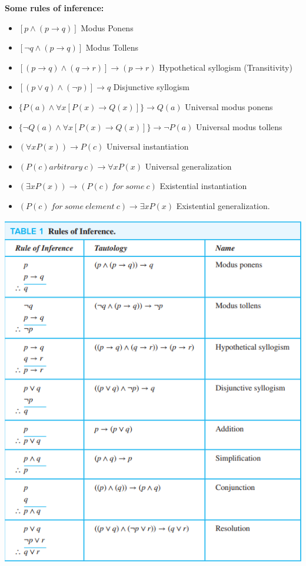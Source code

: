 \documentclass[12pt]{article}
\begin{document}
\medskip
\textbf{Some rules of inference:} 
\begin{itemize}
\item $[ p \wedge (p \rightarrow q) ]$ Modus Ponens
\item $[ \neg q \wedge (p \rightarrow q)]$ Modus Tollens
\item $[(p \rightarrow q) \wedge (q \rightarrow r)] \rightarrow (p \rightarrow r)$ Hypothetical syllogism (Transitivity)
\item $[(p \vee q) \wedge (\neg p)] \rightarrow q$ Disjunctive syllogism
\item $\{P(a) \wedge \forall x [P(x) \rightarrow Q(x)]\} \rightarrow Q(a)$ Universal modus ponens
\item $\{\neg Q(a) \wedge \forall x[P(x) \rightarrow Q(x)]\} \rightarrow \neg P(a)$ Universal modus tollens
\item $(\forall x P(x)) \rightarrow P(c)$ Universal instantiation
\item $(P(c) arbitrary\ c) \rightarrow \forall xP(x)$ Universal generalization
\item $(\exists xP(x)) \rightarrow (P(c)\ for\ some\ c)$ Existential instantiation
\item $(P(c)\ for\ some\ element\ c) \rightarrow \exists x P(x)$ Existential generalization.
\end{itemize}
\includegraphics[scale=0.8]{rules_of_inference} \\
\newpage
\end{document}

